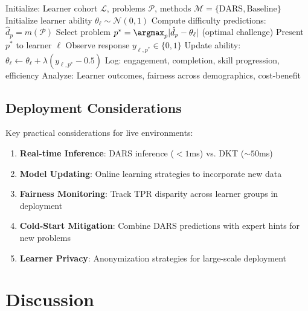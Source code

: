 \documentclass[conference]{IEEEtran}
\begin{document}
\begin{algorithm}[h]
\caption{Live Adaptive Assessment Evaluation}
\begin{algorithmic}[1]
\STATE Initialize: Learner cohort $\mathcal{L}$, problems $\mathcal{P}$, methods $\mathcal{M} = \{\text{DARS}, \text{Baseline}\}$
        \STATE Initialize learner ability $\theta_\ell \sim \mathcal{N}(0,1)$
            \STATE Compute difficulty predictions: $\hat{d}_p = m(\mathcal{P})$
            \STATE Select problem $p^* = \argmax_p |\hat{d}_p - \theta_\ell|$ (optimal challenge)
            \STATE Present $p^*$ to learner $\ell$
            \STATE Observe response $y_{\ell,p^*} \in \{0,1\}$
            \STATE Update ability: $\theta_\ell \leftarrow \theta_\ell + \lambda(y_{\ell,p^*} - 0.5)$
            \STATE Log: engagement, completion, skill progression, efficiency
        \ENDFOR
    \ENDFOR
\ENDFOR
\STATE Analyze: Learner outcomes, fairness across demographics, cost-benefit
\end{algorithmic}
\end{algorithm}

\subsection{Deployment Considerations}

Key practical considerations for live environments:

\begin{enumerate}
    \item \textbf{Real-time Inference}: DARS inference ($< 1$ms) vs. DKT ($\sim 50$ms)
    \item \textbf{Model Updating}: Online learning strategies to incorporate new data
    \item \textbf{Fairness Monitoring}: Track TPR disparity across learner groups in deployment
    \item \textbf{Cold-Start Mitigation}: Combine DARS predictions with expert hints for new problems
    \item \textbf{Learner Privacy}: Anonymization strategies for large-scale deployment
\end{enumerate}

\section{Discussion}
\end{document}
